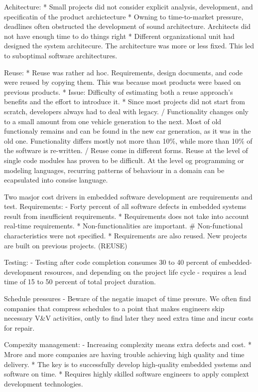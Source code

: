Achitecture:
* Small projects did not consider explicit analysis, development, and specificatin of the product archictecture
* Owning to time-to-market pressure, deadlines often obstructed the development of sound architecture. Architects did not have enough time to do things right
* Different organizational unit had designed the system architecure. The architecture was more or less fixed. This led to suboptimal software architectures. 

Reuse:
* Reuse was rather ad hoc. Requirements, design documents, and code were reused by copying them. This was because most products were based on previous products.
* Issue: Difficulty of estimating both a reuse approach's benefits and the effort to introduce it.
* Since most projects did not start from scratch, developers always had to deal with legacy. 
/ Functionality changes only to a small amount from one vehicle generation to the next. Most of old functionaly remains and can be found in the new car generation, as it was in the old one. Functionality differs mostly not more than 10\%, while more than 10\% of the software is re-written.
/ Reuse come in different forms. Reuse at the level of single code modules has proven to be difficult. At the level og programming or modeling languages, recurring patterns of behaviour in a domain can be ecapsulated into consise language.


Two masjor cost drivers in embedded software development are requirements and test.
Requirements:
- Forty percent of all software defects in embedded systems result from insufficient requirements. 
* Requirements does not take into account real-time requirements.
* Non-functionalities are important.
# Non-functional characteristics were not specified. 
* Requirements are also reused. New projects are built on previous projects. (REUSE)

Testing: 
- Testing after code completion consumes 30 to 40 percent of embedded-development resources, and depending on the project life cycle - requires a lead time of 15 to 50 percent of total project duration.


Schedule pressures
- Beware of the negatie imapct of time presure. We often find companies that compress schedules to a point that makes engineers skip necessary V&V activities, ontly to find later they need extra time and incur costs for repair.


Compexity management:
- Increasing complexity means extra defects and cost. 
* Mrore and more companies are having trouble achieving high quality and time delivery.
* The key is to successfully develop high-quality embedded ysstems and software on time. 
* Requires highly skilled software engineers to apply complext development technologies. 

